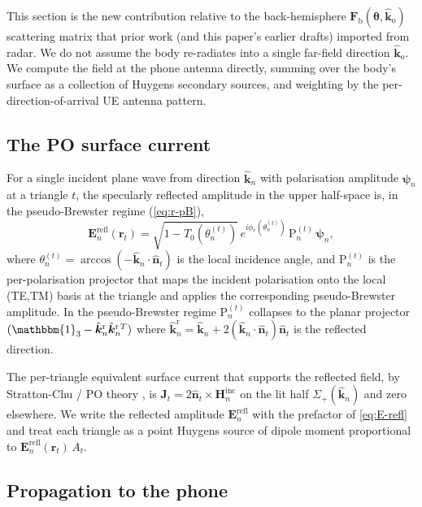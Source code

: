 \documentclass[11pt,a4paper]{article}
\theoremstyle{definition}
\newcommand{\khat}{\hat{\bm{k}}}
\newcommand{\nhat}{\hat{\bm{n}}}
\newcommand{\rr}{\mathbf{r}}
\newcommand{\EE}{\mathbf{E}}
\newcommand{\HH}{\mathbf{H}}
\newcommand{\ident}{\mathbbm{1}}
\newcommand{\thetab}{\bm{\theta}}
\newcommand{\Frib}{\mathbf{F}_{\mathrm{b}}}
\newcommand{\kout}{\hat{\bm{k}}_{\mathrm{o}}}
\begin{document}
This section is the new contribution relative to the back-hemisphere
$\Frib(\thetab,\kout)$ scattering matrix that prior work (and this
paper's earlier drafts) imported from radar.  We do not assume the
body re-radiates into a single far-field direction $\kout$.  We
compute the field at the phone antenna directly, summing over the
body's surface as a collection of Huygens secondary sources, and
weighting by the per-direction-of-arrival UE antenna pattern.

\subsection{The PO surface current}

For a single incident plane wave from direction $\khat_n$ with
polarisation amplitude $\bm\psi_n$ at a triangle $t$, the
specularly reflected amplitude in the upper half-space is, in the
pseudo-Brewster regime (\cref{eq:r-pB}),
\begin{equation}\label{eq:E-refl}
  \EE^{\mathrm{refl}}_n(\rr_t)
  = \sqrt{1-T_0(\theta_n^{(t)})}\,e^{i\phi_r(\theta_n^{(t)})}\,
    \mathrm{P}_n^{(t)}\,\bm\psi_n,
\end{equation}
where $\theta_n^{(t)}=\arccos(-\khat_n\cdot\nhat_t)$ is the local
incidence angle, and $\mathrm{P}_n^{(t)}$ is the per-polarisation
projector that maps the incident polarisation onto the local
(TE,TM) basis at the triangle and applies the corresponding
pseudo-Brewster amplitude.  In the pseudo-Brewster regime
$\mathrm{P}_n^{(t)}$ collapses to the planar projector
$(\ident_3-\khat_n^{\mathrm{r}}\khat_n^{\mathrm{r}\,T})$ where
$\khat_n^{\mathrm{r}}=\khat_n+2(\khat_n\cdot\nhat_t)\nhat_t$ is
the reflected direction.

The per-triangle equivalent surface current that supports the
reflected field, by Stratton-Chu / PO theory \cite{Balanis2005}, is
$\mathbf J_t=2\nhat_t\times\HH_n^{\mathrm{inc}}$ on the lit half
$\Sigma_+(\khat_n)$ and zero elsewhere.  We write the reflected
amplitude $\EE^{\mathrm{refl}}_n$ with the prefactor of
\cref{eq:E-refl} and treat each triangle as a point Huygens
source of dipole moment proportional to
$\EE^{\mathrm{refl}}_n(\rr_t)\,A_t$.

\subsection{Propagation to the phone}
\end{document}
